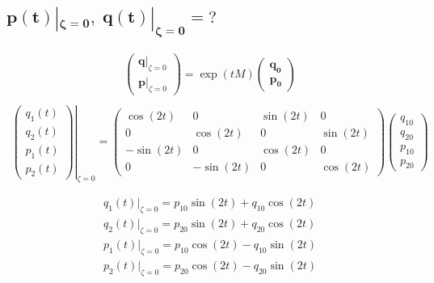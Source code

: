 \documentclass[10pt,a4paper]{article}
\newcommand{\mat}[1]{
    \begin{pmatrix}
        #1
    \end{pmatrix}
}
\begin{document}
\subsection{
    \texorpdfstring{
        $\pmb{ p(t)|_{\zeta=0}, \; q(t)|_{\zeta=0} = \mathit{?} }$
    }{
        p(t)|\{z=0\}, q(t)|\{z=0\} = ?
    }
}
\begin{gather*}
    \mat{
        \bm{q}|_{\zeta=0} \\ \bm{p}|_{\zeta=0}
    }
    =
    \exp(tM)
    \mat{
        \bm{q_0} \\ \bm{p_0}
    }
    \\[5pt]
\end{gather*}
\begin{gather*}
    \left.
    \mat{
        q_1(t) \\ q_2(t) \\ p_1(t) \\ p_2(t)
    }
    \right|_{\zeta=0}
    =
    \mat{\cos{\left(2 t \right)} & 0 & \sin{\left(2 t \right)} & 0\\0 & \cos{\left(2 t \right)} & 0 & \sin{\left(2 t \right)}\\- \sin{\left(2 t \right)} & 0 & \cos{\left(2 t \right)} & 0\\0 & - \sin{\left(2 t \right)} & 0 & \cos{\left(2 t \right)}}
    \mat{
        q_{10} \\ q_{20} \\ p_{10} \\ p_{20}
    }
    \\[5pt]
\end{gather*}
\begin{gather*}
    \\
    q_1(t)|_{\zeta=0} = p_{10} \sin{\left(2 t \right)} + q_{10} \cos{\left(2 t \right)}
    \\[5pt]
    q_2(t)|_{\zeta=0} = p_{20} \sin{\left(2 t \right)} + q_{20} \cos{\left(2 t \right)}
    \\[5pt]
    p_1(t)|_{\zeta=0} = p_{10} \cos{\left(2 t \right)} - q_{10} \sin{\left(2 t \right)}
    \\[5pt]
    p_2(t)|_{\zeta=0} = p_{20} \cos{\left(2 t \right)} - q_{20} \sin{\left(2 t \right)}
    \\[10pt]
\end{gather*}
\end{document}
